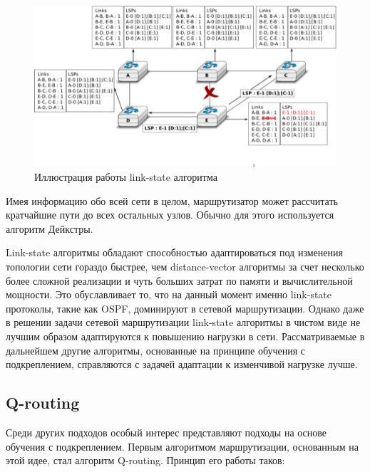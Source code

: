 \documentclass[specification, annotation]{itmo-student-thesis}
\begin{document}
\begin{figure}[!h]
  \caption{Иллюстрация работы link-state алгоритма}\label{ospf-img}
  \centering
  \includegraphics[scale=1.5]{ls-twoway}
\end{figure}

Имея информацию обо всей сети в целом, маршрутизатор может рассчитать кратчайшие
пути до всех остальных узлов. Обычно для этого используется алгоритм
Дейкстры\cite{dijkstra}. 

Link-state алгоритмы обладают способностью адаптироваться под изменения
топологии сети гораздо быстрее, чем distance-vector алгоритмы за счет
несколько более сложной реализации и чуть больших затрат по памяти и
вычислительной мощности. Это обуславливает то, что на данный момент именно
link-state протоколы, такие как OSPF\cite{ospf-rfc}, доминируют в сетевой
маршрутизации. Однако даже в решении задачи сетевой маршрутизации link-state
алгоритмы в чистом виде не лучшим образом адаптируются к повышению нагрузки в
сети. Рассматриваемые в дальнейшем другие алгоритмы, основанные на принципе
обучения с подкреплением, справляются с задачей адаптации к
изменчивой нагрузке лучше.

\subsection{Q-routing}\label{q-routing-desc}

Среди других подходов особый интерес представляют подходы на основе обучения с
подкреплением. Первым алгоритмом маршрутизации, основанным на этой идее, стал
алгоритм Q-routing\cite{q-routing-orig}. Принцип его работы таков:
\end{document}
